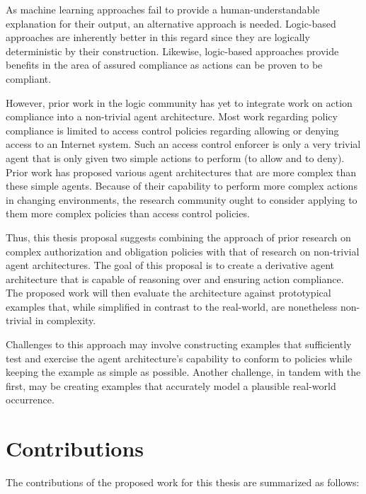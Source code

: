 As machine learning approaches fail to provide a human-understandable explanation for their output, an alternative approach is needed.
Logic-based approaches are inherently better in this regard since they are logically deterministic by their construction.
Likewise, logic-based approaches provide benefits in the area of assured compliance as actions can be proven to be compliant.

However, prior work in the logic community has yet to integrate work on action compliance into a non-trivial agent architecture.
Most work regarding policy compliance is limited to access control policies regarding allowing or denying access to an Internet system.
Such an access control enforcer is only a very trivial agent that is only given two simple actions to perform (to allow and to deny).
Prior work has proposed various agent architectures that are more complex than these simple agents.
Because of their capability to perform more complex actions in changing environments, the research community ought to consider applying to them more complex policies than access control policies.

Thus, this thesis proposal suggests combining the approach of prior research on complex authorization and obligation policies with that of research on non-trivial agent architectures.
The goal of this proposal is to create a derivative agent architecture that is capable of reasoning over and ensuring action compliance.
The proposed work will then evaluate the architecture against prototypical examples that, while simplified in contrast to the real-world, are nonetheless non-trivial in complexity.

Challenges to this approach may involve constructing examples that sufficiently test and exercise the agent architecture's capability to conform to policies while keeping the example as simple as possible.
Another challenge, in tandem with the first, may be creating examples that accurately model a plausible real-world occurrence.

\section{Contributions}

The contributions of the proposed work for this thesis are summarized as follows:

